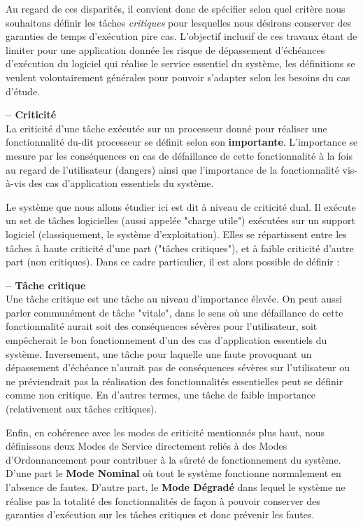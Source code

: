 \documentclass[french, a4paper, 11pt, twoside, pdftex]{StyleThese}
\begin{document}
	Au regard de ces disparités, il convient donc de spécifier selon quel critère nous souhaitons définir les tâches \textit{critiques} pour lesquelles nous désirons conserver des garanties de temps d'exécution pire cas. L'objectif inclusif de ces travaux étant de limiter pour une application donnée les risque de dépassement d'échéances d'exécution du logiciel qui réalise le service essentiel du système, les définitions se veulent volontairement générales pour pouvoir s'adapter selon les besoins du cas d'étude.
	
	\begin{definition}\textbf{ -- Criticité} \\
		La criticité d'une tâche exécutée sur un processeur donné pour réaliser une fonctionnalité du-dit processeur se définit selon son \textbf{importante}. L'importance se mesure par les conséquences en cas de défaillance de cette fonctionnalité à la fois au regard de l'utilisateur (dangers) ainsi que l'importance de la fonctionnalité vis-à-vis des cas d'application essentiels du système. 
	\end{definition}

    Le système que nous allons étudier ici est dit à niveau de criticité dual. Il exécute un set de tâches logicielles (aussi appelée "charge utile") exécutées sur un support logiciel (classiquement, le système d'exploitation). Elles se répartissent entre les tâches à haute criticité d'une part ("tâches critiques"), et à faible criticité d'autre part (non critiques). 	Dans ce cadre particulier, il est alors possible de définir : 
    
    \begin{definition}\textbf{ -- Tâche critique} \\
    	Une tâche critique est une tâche au niveau d'importance élevée. On peut aussi parler communément de tâche "vitale", dans le sens où une défaillance de cette fonctionnalité aurait soit des conséquences sévères pour l'utilisateur, soit empêcherait le bon fonctionnement d'un des cas d'application essentiels du système.
    	Inversement, une tâche pour laquelle une faute provoquant un dépassement d'échéance n'aurait pas de conséquences sévères sur l'utilisateur ou ne préviendrait pas la réalisation des fonctionnalités essentielles peut se définir comme non critique. En d'autres termes, une tâche de faible importance (relativement aux tâches critiques).
    \end{definition}
    
    Enfin, en cohérence avec les modes de criticité mentionnés plus haut, nous définissons deux Modes de Service directement reliés à des Modes d'Ordonnancement pour contribuer à la sûreté de fonctionnement du système. D'une part le \textbf{Mode Nominal} où tout le système fonctionne normalement en l'absence de fautes. D'autre part, le \textbf{Mode Dégradé} dans lequel le système ne réalise pas la totalité des fonctionnalités de façon à pouvoir conserver des garanties d'exécution sur les tâches critiques et donc prévenir les fautes.
    
\end{document}
